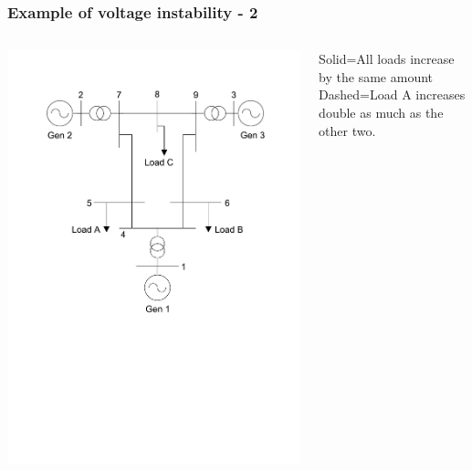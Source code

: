 \documentclass{beamer}
\begin{document}
\begin{frame}[label=exampledir]
\frametitle{Example of voltage instability - 2}
\begin{columns}
\includegraphics[width=\textwidth]{Figs/Ieee9bus.pdf}

Solid=All loads increase by the same amount\\
Dashed=Load A increases double as much as the other two.
\end{columns}
\end{frame}
\end{document}
